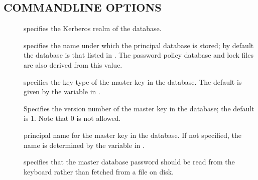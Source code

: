 \documentclass[letterpaper,10pt,english]{sphinxmanual}
\begin{document}
\subsection{COMMAND\sphinxhyphen{}LINE OPTIONS}
\label{\detokenize{admin/admin_commands/kdb5_util:command-line-options}}\label{\detokenize{admin/admin_commands/kdb5_util:kdb5-util-options}}\begin{description}
\item[{ }] \leavevmode
\sphinxAtStartPar
specifies the Kerberos realm of the database.

\item[{ }] \leavevmode
\sphinxAtStartPar
specifies the name under which the principal database is stored;
by default the database is that listed in {\hyperref[\detokenize{admin/conf_files/kdc_conf:kdc-conf-5}]{}}.  The
password policy database and lock files are also derived from this
value.

\item[{ }] \leavevmode
\sphinxAtStartPar
specifies the key type of the master key in the database.  The
default is given by the  variable in
{\hyperref[\detokenize{admin/conf_files/kdc_conf:kdc-conf-5}]{}}.

\item[{ }] \leavevmode
\sphinxAtStartPar
Specifies the version number of the master key in the database;
the default is 1.  Note that 0 is not allowed.

\item[{ }] \leavevmode
\sphinxAtStartPar
principal name for the master key in the database.  If not
specified, the name is determined by the 
variable in {\hyperref[\detokenize{admin/conf_files/kdc_conf:kdc-conf-5}]{}}.

\item[{}] \leavevmode
\sphinxAtStartPar
specifies that the master database password should be read from
the keyboard rather than fetched from a file on disk.


\end{description}
\end{document}
